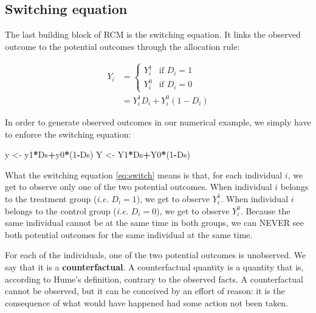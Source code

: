 \documentclass[]{book}
\newenvironment{Shaded}{\begin{snugshade}}{\end{snugshade}}
\newcommand{\DecValTok}[1]{\textcolor[rgb]{0.00,0.00,0.81}{#1}}
\newcommand{\NormalTok}[1]{#1}
\newcommand{\OperatorTok}[1]{\textcolor[rgb]{0.81,0.36,0.00}{\textbf{#1}}}
\newcommand{\StringTok}[1]{\textcolor[rgb]{0.31,0.60,0.02}{#1}}
\theoremstyle{definition}
\theoremstyle{definition}
\theoremstyle{definition}
\theoremstyle{remark}
\let\BeginKnitrBlock\begin \let\EndKnitrBlock\end
\begin{document}
\hypertarget{switching-equation}{%
\subsection{Switching equation}\label{switching-equation}}

The last building block of RCM is the switching equation.
It links the observed outcome to the potential outcomes through the allocation rule:

\begin{align}
 \label{eq:switch}
  Y_i & = 
    \begin{cases}
    Y_i^1 & \text{if } D_i=1\\
    Y_i^0 & \text{if } D_i=0
    \end{cases} \\
    & = Y_i^1D_i + Y_i^0(1-D_i) \nonumber
\end{align}

\BeginKnitrBlock{example}
\protect\hypertarget{exm:unnamed-chunk-4}{}{\label{exm:unnamed-chunk-4} }In order to generate observed outcomes in our numerical example, we simply have to enforce the switching equation:
\EndKnitrBlock{example}

\begin{Shaded}
\begin{Highlighting}[]
\NormalTok{y <-}\StringTok{ }\NormalTok{y1}\OperatorTok{*}\NormalTok{Ds}\OperatorTok{+}\NormalTok{y0}\OperatorTok{*}\NormalTok{(}\DecValTok{1}\OperatorTok{-}\NormalTok{Ds)}
\NormalTok{Y <-}\StringTok{ }\NormalTok{Y1}\OperatorTok{*}\NormalTok{Ds}\OperatorTok{+}\NormalTok{Y0}\OperatorTok{*}\NormalTok{(}\DecValTok{1}\OperatorTok{-}\NormalTok{Ds)}
\end{Highlighting}
\end{Shaded}

What the switching equation \eqref{eq:switch} means is that, for each individual \(i\), we get to observe only one of the two potential outcomes.
When individual \(i\) belongs to the treatment group (\emph{i.e.} \(D_i=1\)), we get to observe \(Y_i^1\).
When individual \(i\) belongs to the control group (\emph{i.e.} \(D_i=0\)), we get to observe \(Y_i^0\).
Because the same individual cannot be at the same time in both groups, we can NEVER see both potential outcomes for the same individual at the same time.

For each of the individuals, one of the two potential outcomes is unobserved.
We say that it is a \textbf{counterfactual}.
A counterfactual quantity is a quantity that is, according to Hume's definition, contrary to the observed facts.
A counterfactual cannot be observed, but it can be conceived by an effort of reason: it is the consequence of what would have happened had some action not been taken.
\end{document}
